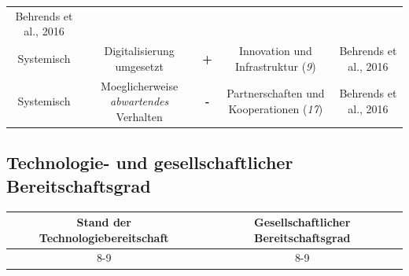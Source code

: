 \documentclass[
]{book}
\begin{document}
\begin{longtable}[]{@{}ccccc@{}}
\begin{minipage}[t]{0.17\columnwidth}
Behrends et al., 2016\strut
\end{minipage}\tabularnewline
\begin{minipage}[t]{0.17\columnwidth}\centering
Systemisch\strut
\end{minipage} & \begin{minipage}[t]{0.16\columnwidth}\centering
Digitalisierung umgesetzt\strut
\end{minipage} & \begin{minipage}[t]{0.17\columnwidth}\centering
\textbf{+}\strut
\end{minipage} & \begin{minipage}[t]{0.17\columnwidth}\centering
Innovation und Infrastruktur (\emph{9})\strut
\end{minipage} & \begin{minipage}[t]{0.17\columnwidth}\centering
Behrends et al., 2016\strut
\end{minipage}\tabularnewline
\begin{minipage}[t]{0.17\columnwidth}\centering
Systemisch\strut
\end{minipage} & \begin{minipage}[t]{0.16\columnwidth}\centering
Moeglicherweise \emph{abwartendes} Verhalten\strut
\end{minipage} & \begin{minipage}[t]{0.17\columnwidth}\centering
\textbf{-}\strut
\end{minipage} & \begin{minipage}[t]{0.17\columnwidth}\centering
Partnerschaften und Kooperationen (\emph{17})\strut
\end{minipage} & \begin{minipage}[t]{0.17\columnwidth}\centering
Behrends et al., 2016\strut
\end{minipage}\tabularnewline
\bottomrule
\end{longtable}

\hypertarget{technologie--und-gesellschaftlicher-bereitschaftsgrad-26}{%
\subsection*{Technologie- und gesellschaftlicher Bereitschaftsgrad}\label{technologie--und-gesellschaftlicher-bereitschaftsgrad-26}}

\begin{longtable}[]{@{}cc@{}}
\toprule
Stand der Technologiebereitschaft & Gesellschaftlicher Bereitschaftsgrad\tabularnewline
\midrule
\endhead
8-9 & 8-9\tabularnewline
\bottomrule
\end{longtable}
\end{document}
